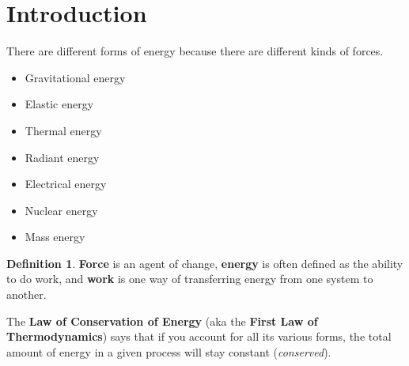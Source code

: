\documentclass{article}
\theoremstyle{definition}
\theoremstyle{definition}
\theoremstyle{definition}
\theoremstyle{definition}
\newtheorem*{definition}{Definition}
\theoremstyle{definition}
\begin{document}
\noindent

\section{Introduction}
There are different forms of energy because there are different kinds of forces. 
\begin{itemize}
    \item Gravitational energy
    \item Elastic energy
    \item Thermal energy
    \item Radiant energy
    \item Electrical energy
    \item Nuclear energy
    \item Mass energy
\end{itemize}
\begin{definition}
    \textbf{Force} is an agent of change, \textbf{energy} is often defined as the ability to do work, and \textbf{work} is one way of transferring energy from one system to another.
\end{definition}
The \textbf{Law of Conservation of Energy} (aka the \textbf{First Law of Thermodynamics}) says that if you account for all its various forms, the total amount of energy in a given process will stay constant (\textit{conserved}).
\end{document}
